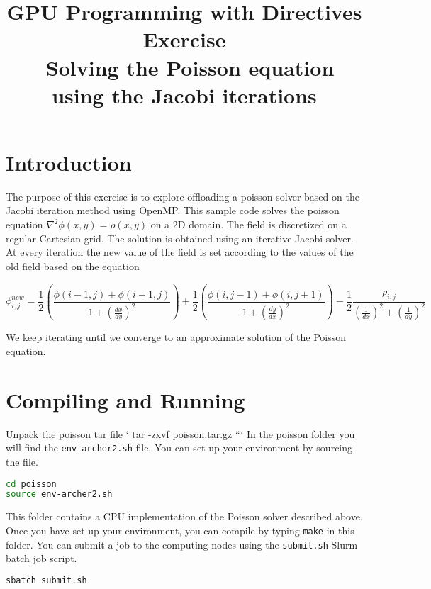 \documentclass{article}
\title{GPU Programming with Directives Exercise \\\ Solving the Poisson equation using the Jacobi iterations}
\author{}
\date{}
\begin{document}
\maketitle

\section{Introduction}

The purpose of this exercise is to explore offloading a poisson solver based on the Jacobi iteration method using OpenMP. 
This sample code solves the poisson equation $\nabla^2 \phi(x,y) = \rho(x,y)$ on a 2D domain. 
The field is discretized on a regular Cartesian grid.
The solution is obtained using an iterative Jacobi solver. At every iteration the new value of the field is set according to the values of the old field based on the equation

\begin{equation}
    \phi^{new}_{i,j}= \frac{1}{2} \left( \frac{\phi( i-1,j) + \phi(i+1,j)}{1+\left(\frac{dx}{dy}\right)^2}\right)  + \frac{1}{2} \left( \frac{\phi( i ,j-1) + \phi(i,j+1)}{1+\left(\frac{dy}{dx}\right)^2}\right) -  \frac{1}{2}\frac{\rho_{i,j}}{\left(\frac{1}{dx}\right)^2 + \left(\frac{1}{dy}\right)^2 }
\end{equation}

We keep iterating until we converge to an approximate solution of the Poisson equation.

\section{Compiling and Running}
Unpack the poisson tar file
`
tar -zxvf poisson.tar.gz
```
In the poisson folder you will find the \texttt{env-archer2.sh} file. You can set-up your environment by sourcing the file.

\begin{lstlisting}[language=Bash]
cd poisson
source env-archer2.sh
\end{lstlisting}

This folder contains a CPU implementation of the Poisson solver described above. 
Once you have set-up your environment, you can compile by typing \texttt{make} in this folder.
You can submit a job to the computing nodes using the \texttt{submit.sh} Slurm batch job script.

\begin{lstlisting}[language=Bash]
sbatch submit.sh
\end{lstlisting}
\end{document}
